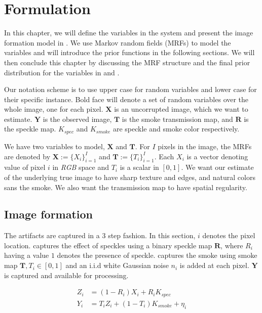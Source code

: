 \chapter{Formulation}

In this chapter, we will define the variables in the system and present the image formation model in . We use Markov random fields (MRFs) to model the variables and will introduce the prior functions in the following sections. We will then conclude this chapter by discussing the MRF structure and the final prior distribution for the variables in  and .

Our notation scheme is to use upper case for random variables and lower case for their specific instance. Bold face will denote a set of random variables over the whole image, one for each pixel. $\mathbf{X}$ is an uncorrupted image, which we want to estimate. $\mathbf{Y}$ is the observed image, $\mathbf{T}$ is the smoke transmission map, and $\mathbf{R}$ is the speckle map. $K_{spec}$ and $K_{smoke}$ are speckle and smoke color respectively.

We have two variables to model, $\mathbf{X}$ and $\mathbf{T}$. For $I$ pixels in the image, the MRFs are denoted by $\mathbf{X} := \lbrace X_i \rbrace_{i=1}^{I}$ and $\mathbf{T} := \lbrace T_i \rbrace_{i=1}^{I}$. Each $X_i$ is a vector denoting value of pixel $i$ in \textit{RGB} space and $T_i$ is a scalar in  $[0, 1]$. We want our estimate of the underlying true image to have sharp texture and edges, and natural colors sans the smoke. We also want the transmission map to have spatial regularity.

\section{Image formation}
\label{sec:imgformation}
The artifacts are captured in a 3 step fashion. In this section, $i$ denotes the pixel location.  captures the effect of speckles using a binary speckle map $\mathbf{R}$, where $R_i$ having a value $1$ denotes the presence of speckle.  captures the smoke using smoke map $\mathbf{T}, T_i \in [0, 1]$ and an i.i.d white Gaussian noise $n_i$ is added at each pixel. $\mathbf{Y}$ is captured and available for processing.

\begin{align}
    Z_i &= (1 - R_i) X_i  + R_i K_{spec} \label{eqn:speckle} \\
    Y_i &= T_i Z_i + (1 - T_i) K_{smoke} + \eta_i \label{eqn:smokenoise}
\end{align}

